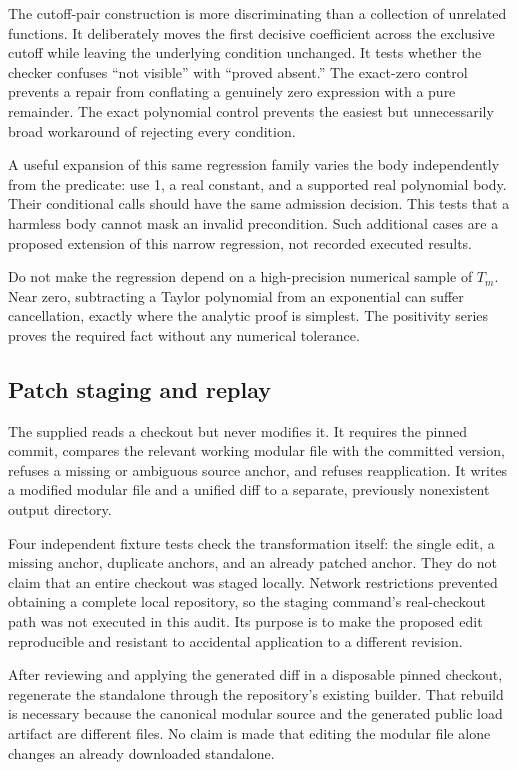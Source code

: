 \documentclass[11pt,letterpaper]{article}
\newcommand{\code}[1]{\texttt{\small\detokenize{#1}}}
\begin{document}
The cutoff-pair construction is more discriminating than a collection of unrelated functions. It deliberately moves the first decisive coefficient across the exclusive cutoff while leaving the underlying condition unchanged. It tests whether the checker confuses ``not visible'' with ``proved absent.'' The exact-zero control prevents a repair from conflating a genuinely zero expression with a pure remainder. The exact polynomial control prevents the easiest but unnecessarily broad workaround of rejecting every \code{Element} condition.

A useful expansion of this same regression family varies the body independently from the predicate: use 1, a real constant, and a supported real polynomial body. Their conditional calls should have the same admission decision. This tests that a harmless body cannot mask an invalid precondition. Such additional cases are a proposed extension of this narrow regression, not recorded executed results.

Do not make the regression depend on a high-precision numerical sample of \(T_m\). Near zero, subtracting a Taylor polynomial from an exponential can suffer cancellation, exactly where the analytic proof is simplest. The positivity series proves the required fact without any numerical tolerance.

\subsection{Patch staging and replay}
The supplied \code{code/patch_predicate.py} reads a checkout but never modifies it. It requires the pinned commit, compares the relevant working modular file with the committed version, refuses a missing or ambiguous source anchor, and refuses reapplication. It writes a modified modular file and a unified diff to a separate, previously nonexistent output directory.

Four independent fixture tests check the transformation itself: the single edit, a missing anchor, duplicate anchors, and an already patched anchor. They do not claim that an entire checkout was staged locally. Network restrictions prevented obtaining a complete local repository, so the staging command's real-checkout path was not executed in this audit. Its purpose is to make the proposed edit reproducible and resistant to accidental application to a different revision.

After reviewing and applying the generated diff in a disposable pinned checkout, regenerate the standalone through the repository's existing builder. That rebuild is necessary because the canonical modular source and the generated public load artifact are different files. No claim is made that editing the modular file alone changes an already downloaded standalone.
\end{document}
